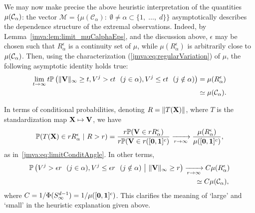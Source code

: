 We may now  make precise the  above heuristic
interpretation of the quantities $\mu(\mathcal{C}_\alpha)$: the vector
$\mathcal{M}=\{ \mu(\mathcal{C}_{\alpha}):\; \emptyset \neq
\alpha\subset\{1,\; \ldots,\; d \}\}$ asymptotically describes the
dependence structure of the extremal observations. 
%
Indeed, by
Lemma~\ref{jmva:lem:limit_muCalphaEps}, and the discussion above, $
\epsilon$ may be chosen such that $R_\alpha^\epsilon$ is a
continuity set of $\mu$, while $\mu(R_\alpha^\epsilon)$ is
arbitrarily close to $\mu(\mathcal{C}_\alpha)$.  Then, using the
characterization (\ref{jmva:eq:regularVariation}) of  $\mu$, 
the following asymptotic identity  holds true:
\begin{align}
\lim_{t\to\infty} t \mathbb{P}\left( \|\mathbf V\|_\infty\ge t, V^j> \epsilon t~~ (j \in\alpha), V^j \le \epsilon t~~ (j\notin\alpha)\right) &=\mu(R_\alpha^\epsilon) \\ \nonumber
 &\simeq \mu(\mathcal{C}_\alpha). \nonumber
\end{align}
\begin{remark}
  \label{jmva:rk_approx_mu_n}
In terms of conditional probabilities, denoting $R = \|T(\mathbf X)\|$, where
  $T$ is the standardization map $\mathbf X\mapsto \mathbf V$,  we have
\begin{align}
\nonumber  \mathbb{P}(T(\mathbf X)\in r R_\alpha^\epsilon~|~ R>r) = 
\frac{r \mathbb{P}(\mathbf V\in r R_\alpha^\epsilon)}{ r\mathbb{P}(\mathbf V \in r([\mathbf 0,\mathbf{1}]^c)} \xrightarrow[r\to\infty]{}\frac{\mu(R_\alpha^\epsilon)}{\mu([\mathbf 0,\mathbf{1}]^c)},
\end{align}
 as in~\eqref{jmva:eq:limitConditAngle}. In other terms, 
\begin{align}
\mathbb{P}\left( V^j> \epsilon r~~ (j \in\alpha), V^j \le \epsilon r~~ (j\notin\alpha) ~\big\vert~ \|\mathbf V\|_\infty\ge r \right) &\xrightarrow[r\to\infty]{} C \mu(R_\alpha^\epsilon) \\ \nonumber
&~~~~~\simeq C\mu(\mathcal{C}_\alpha), \nonumber
\end{align}
where $C = 1/ \Phi(S_\infty^{d-1}) =1/\mu([\mathbf 0,\mathbf{1}]^c) $.
This clarifies the meaning of `large' and `small' in the heuristic
explanation given above. 
\end{remark}

